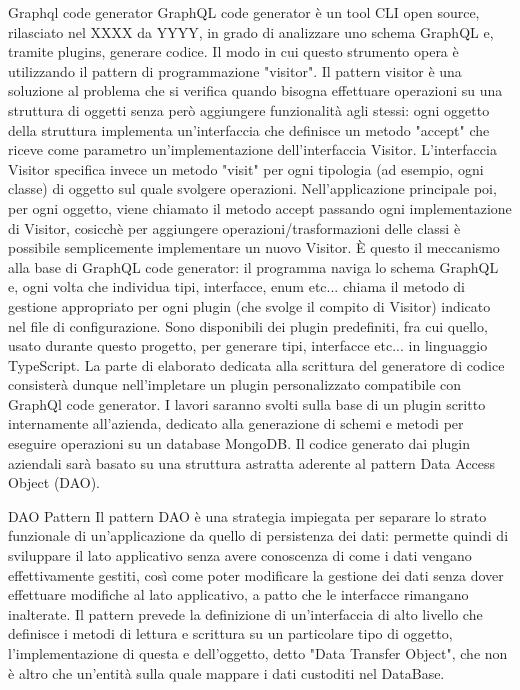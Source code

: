    Graphql code generator
        GraphQL code generator è un tool CLI open source, rilasciato nel XXXX da YYYY, in grado di analizzare uno schema GraphQL e, tramite plugins, generare codice.
        Il modo in cui questo strumento opera è utilizzando il pattern di programmazione "visitor".
        Il pattern visitor è una soluzione al problema che si verifica quando bisogna effettuare operazioni su una struttura di oggetti senza però aggiungere funzionalità agli stessi:
        ogni oggetto della struttura implementa un'interfaccia che definisce un metodo "accept" che riceve come parametro un'implementazione dell'interfaccia Visitor.
        L'interfaccia Visitor specifica invece un metodo "visit" per ogni tipologia (ad esempio, ogni classe) di oggetto sul quale svolgere operazioni.
        Nell'applicazione principale poi, per ogni oggetto, viene chiamato il metodo accept passando ogni implementazione di Visitor, cosicchè per aggiungere operazioni/trasformazioni delle classi è possibile semplicemente implementare un nuovo Visitor.
        È questo il meccanismo alla base di GraphQL code generator: il programma naviga lo schema GraphQL e, ogni volta che individua tipi, interfacce, enum etc... chiama il metodo di gestione appropriato per ogni plugin (che svolge il compito di Visitor) indicato nel file di configurazione.
        Sono disponibili dei plugin predefiniti, fra cui quello, usato durante questo progetto, per generare tipi, interfacce etc... in linguaggio TypeScript.
        La parte di elaborato dedicata alla scrittura del generatore di codice consisterà dunque nell'impletare un plugin personalizzato compatibile con GraphQl code generator.
        I lavori saranno svolti sulla base di un plugin scritto internamente all'azienda, dedicato alla generazione di schemi e metodi per eseguire operazioni su un database MongoDB.
        Il codice generato dai plugin aziendali sarà basato su una struttura astratta aderente al pattern Data Access Object (DAO).

    DAO Pattern
        Il pattern DAO è una strategia impiegata per separare lo strato funzionale di un'applicazione da quello di persistenza dei dati: permette quindi di sviluppare il lato applicativo senza avere conoscenza di come i dati vengano effettivamente gestiti, così come poter modificare la gestione dei dati
        senza dover effettuare modifiche al lato applicativo, a patto che le interfacce rimangano inalterate.
        Il pattern prevede la definizione di un'interfaccia di alto livello che definisce i metodi di lettura e scrittura su un particolare tipo di oggetto, l'implementazione di questa e dell'oggetto, detto "Data Transfer Object", che non è altro che un'entità sulla quale mappare i dati custoditi nel DataBase.
        
